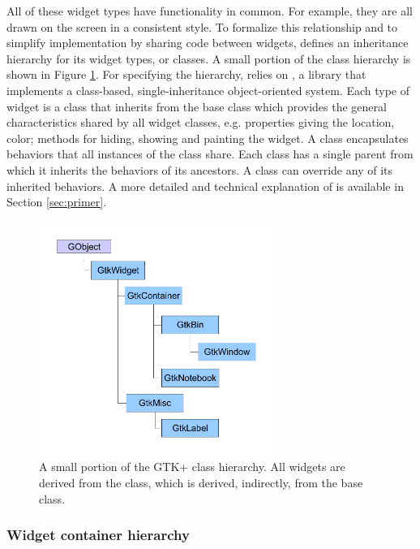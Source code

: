 \documentclass[article,shortnames]{jss}
\begin{document}
All of these widget types have functionality in common. For example,
they are all drawn on the screen in a consistent style. To formalize
this relationship and to simplify implementation by sharing code
between widgets,  defines an inheritance hierarchy for its
widget types, or classes. A small portion of the  class
hierarchy is shown in Figure \ref{fig:class-hierarchy}. For specifying
the hierarchy,  relies on , a 
library that implements a class-based, single-inheritance
object-oriented system.  Each type of  widget is a
 class that inherits from the base  class
which provides the general characteristics shared by all widget
classes, e.g. properties giving the location, color; methods for
hiding, showing and painting the widget. A  class
encapsulates behaviors that all instances of the class share.  Each
class has a single parent from which it inherits the behaviors of its
ancestors. A class can override any of its inherited behaviors.  A
more detailed and technical explanation of  is available
in Section \ref{sec:primer}.

\begin{figure}[h!tbp]
\begin{center}
\includegraphics[width=3in]{class-hierarchy.pdf}
\caption{\label{fig:class-hierarchy}A small portion of the GTK+ class
hierarchy. 
All widgets are derived from the  class, which is
derived, 
indirectly, from the  base class.}
\end{center}
\end{figure}

\subsubsection{Widget container hierarchy}
\end{document}
